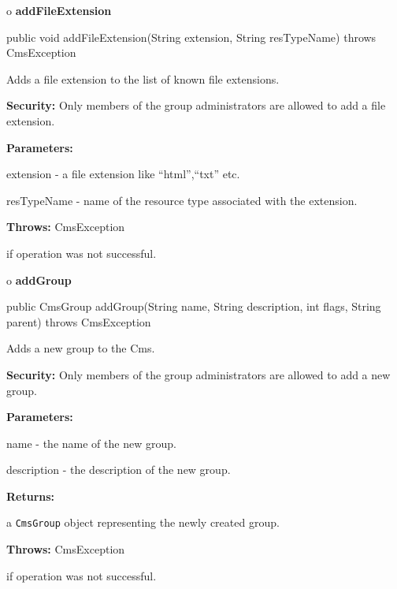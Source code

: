o {\bf addFileExtension} 

\begin{PRE}
 public void addFileExtension(String extension,
                              String resTypeName) throws CmsException
\end{PRE}

\begin{description}
\htmlDD Adds a file extension to the list of known file extensions. 

{\bf Security:} Only members of the group administrators are allowed to add a
file extension. 

\begin{description}
\item {\bf Parameters:}  

extension - a file extension like ``html'',``txt'' etc.  

resTypeName - name of the resource type associated with the extension.  
\item {\bf Throws:} CmsException  

if operation was not successful.  
\end{description}

\end{description}

o {\bf addGroup} 

\begin{PRE}
 public CmsGroup addGroup(String name,
                          String description,
                          int flags,
                          String parent) throws CmsException
\end{PRE}

\begin{description}
\htmlDD Adds a new group to the Cms. 

{\bf Security:} Only members of the group administrators are allowed to add a
new group. 

\begin{description}
\item {\bf Parameters:}  

name - the name of the new group.  

description - the description of the new group.  
\item {\bf Returns:}  

a {\tt CmsGroup} object representing the newly created group.  
\item {\bf Throws:} CmsException  

if operation was not successful.  
\end{description}

\end{description}

